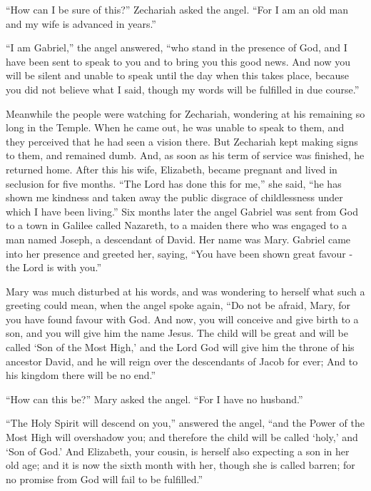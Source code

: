  ``How can I be sure of this?'' Zechariah asked the angel.
``For I am an old man and my wife is advanced in years.''

 ``I am Gabriel,'' the angel answered, ``who stand in the
presence of God, and I have been sent to speak to you and to bring you
this good news.  And now you will be silent and unable to
speak until the day when this takes place, because you did not believe
what I said, though my words will be fulfilled in due course.''

 Meanwhile the people were watching for Zechariah,
wondering at his remaining so long in the Temple.  When he
came out, he was unable to speak to them, and they perceived that he had
seen a vision there. But Zechariah kept making signs to them, and
remained dumb.  And, as soon as his term of service was
finished, he returned home.  After this his wife,
Elizabeth, became pregnant and lived in seclusion for five months.
 ``The Lord has done this for me,'' she said, ``he has
shown me kindness and taken away the public disgrace of childlessness
under which I have been living.''  Six months later the
angel Gabriel was sent from God to a town in Galilee called Nazareth,
 to a maiden there who was engaged to a man named Joseph, a
descendant of David. Her name was Mary.  Gabriel came into
her presence and greeted her, saying, ``You have been shown great favour
- the Lord is with you.''

 Mary was much disturbed at his words, and was wondering to
herself what such a greeting could mean,  when the angel
spoke again, ``Do not be afraid, Mary, for you have found favour with
God.  And now, you will conceive and give birth to a son,
and you will give him the name Jesus.  The child will be
great and will be called `Son of the Most High,' and the Lord God will
give him the throne of his ancestor David,  and he will
reign over the descendants of Jacob for ever; And to his kingdom there
will be no end.''

 ``How can this be?'' Mary asked the angel. ``For I have no
husband.''

 ``The Holy Spirit will descend on you,'' answered the
angel, ``and the Power of the Most High will overshadow you; and
therefore the child will be called `holy,' and `Son of God.'
 And Elizabeth, your cousin, is herself also expecting a
son in her old age; and it is now the sixth month with her, though she
is called barren;  for no promise from God will fail to be
fulfilled.''

